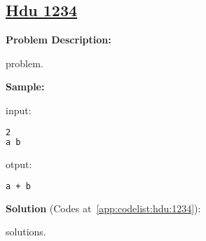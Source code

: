 \subsection{\href{https://www.weblink.com}{Hdu 1234}}\label{app:problemlist:hdu:1234}

\textbf{Problem Description:}\par

problem.\par



\textbf{Sample:}\par

input:\par
\begin{lstlisting}[language=bash]
2
a b
\end{lstlisting}

otput:\par
\begin{lstlisting}[language=bash]
a + b
\end{lstlisting}



\textbf{Solution }(Codes at~\ref{app:codelist:hdu:1234}):\par

solutions.\par



